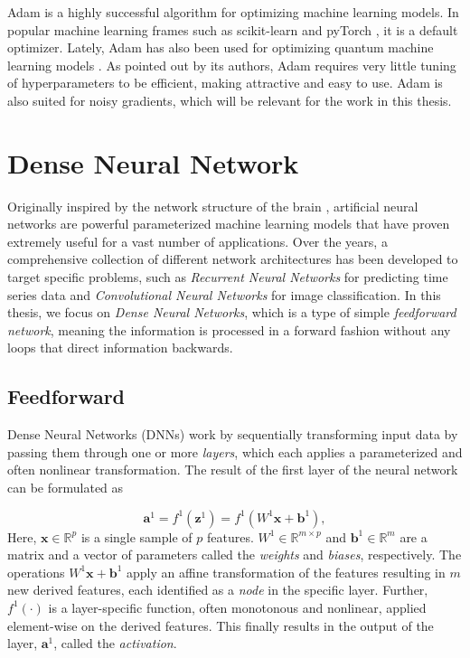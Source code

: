 Adam is a highly successful algorithm for optimizing machine learning models. In popular machine learning frames such as scikit-learn \cite{scikit-learn} and pyTorch \cite{pytorch}, it is a default optimizer. Lately, Adam has also been used for optimizing quantum machine learning models \cite{abbas2020power, skolik2020layerwise}. As pointed out by its authors, Adam requires very little tuning of hyperparameters to be efficient, making attractive and easy to use. Adam is also suited for noisy gradients, which will be relevant for the work in this thesis. 

\section{Dense Neural Network}\label{sec:DenseNeuralNetwork}
Originally inspired by the network structure of the brain \cite{hands-on}, artificial neural networks are powerful parameterized machine learning models that have proven extremely useful for a vast number of applications. Over the years, a comprehensive collection of different network architectures has been developed to target specific problems, such as \emph{Recurrent Neural Networks} for predicting time series data and \emph{Convolutional Neural Networks} for image classification. In this thesis, we focus on \emph{Dense Neural Networks}, which is a type of simple \emph{feedforward network}, meaning the information is processed in a forward fashion without any loops that direct information backwards.

\subsection{Feedforward}\label{sec:FeedforwardDNN}
Dense Neural Networks (DNNs) work by sequentially transforming input data by passing them through one or more \emph{layers}, which each applies a parameterized and often nonlinear transformation. The result of the first layer of the neural network can be formulated as

\begin{equation}\label{eq:FeedforwardSingle}
    \boldsymbol{a}^1 = f^1(\boldsymbol{z}^1) = f^1(W^1 \boldsymbol{x} + \boldsymbol{b}^1),
\end{equation}
Here, $\boldsymbol{x} \in \mathbb{R}^p$ is a single sample of $p$ features. $W^1 \in \mathbb{R}^{m \times p}$ and $\boldsymbol{b}^1 \in \mathbb{R}^{m}$ are a matrix and a vector of parameters called the \emph{weights} and \emph{biases}, respectively. The operations $W^1 \boldsymbol{x} + \boldsymbol{b}^1$ apply an affine transformation of the features resulting in $m$ new derived features, each identified as a \emph{node} in the specific layer. Further, $f^1(\cdot)$ is a layer-specific function, often monotonous and nonlinear, applied element-wise on the derived features. This finally results in the output of the layer, $\boldsymbol{a}^1$, called the \emph{activation}.

